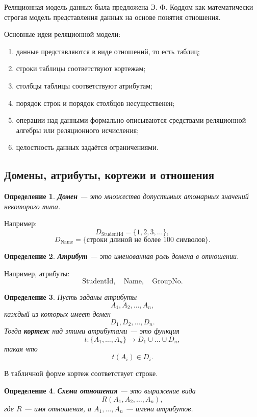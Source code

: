 \documentclass[12pt,a4paper]{article}
\newtheorem{definition}{Определение}[section]
\theoremstyle{remark}
\begin{document}
Реляционная модель данных была предложена Э. Ф. Коддом как математически строгая модель представления данных на основе понятия отношения.

Основные идеи реляционной модели:
\begin{enumerate}
    \item данные представляются в виде отношений, то есть таблиц;
    \item строки таблицы соответствуют кортежам;
    \item столбцы таблицы соответствуют атрибутам;
    \item порядок строк и порядок столбцов несущественен;
    \item операции над данными формально описываются средствами реляционной алгебры или реляционного исчисления;
    \item целостность данных задаётся ограничениями.
\end{enumerate}

\subsection{Домены, атрибуты, кортежи и отношения}

\begin{definition}
\textbf{Домен} --- это множество допустимых атомарных значений некоторого типа.
\end{definition}

Например:
\[
D_{\text{StudentId}} = \{1,2,3,\dots\},
\]
\[
D_{\text{Name}} = \{\text{строки длиной не более 100 символов}\}.
\]

\begin{definition}
\textbf{Атрибут} --- это именованная роль домена в отношении.
\end{definition}

Например, атрибуты:
\[
\text{StudentId}, \quad \text{Name}, \quad \text{GroupNo}.
\]

\begin{definition}
Пусть заданы атрибуты
\[
A_1, A_2, \dots, A_n,
\]
каждый из которых имеет домен
\[
D_1, D_2, \dots, D_n.
\]
Тогда \textbf{кортеж} над этими атрибутами --- это функция
\[
t : \{A_1,\dots,A_n\} \to D_1 \cup \dots \cup D_n,
\]
такая что
\[
t(A_i) \in D_i.
\]
\end{definition}

В табличной форме кортеж соответствует строке.

\begin{definition}
\textbf{Схема отношения} --- это выражение вида
\[
R(A_1, A_2, \dots, A_n),
\]
где $R$ --- имя отношения, а $A_1,\dots,A_n$ --- имена атрибутов.
\end{definition}
\end{document}
